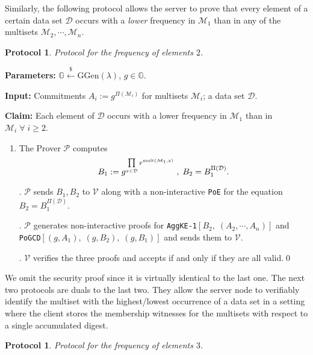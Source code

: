 \documentclass[11pt, lettersize, notitlepage, leqno, footskip=0.6cm]{article}
\newcommand{\pl}{\prod\limits}
\newcommand{\mc}{\mathcal}
\newcommand{\mb}{\mathbb}
\newcommand{\mr}{\mathrm}
\newcommand{\lamb}{\lambda}
\newcommand{\mP}{\mc{P}}
\newcommand{\V}{\mc{V}}
\newcommand{\vs}{\vspace{-0.15cm}}
\newcommand{\noin}{\noindent}
\newtheorem{Prot}[Thm]{Protocol}
\numberwithin{equation}{section}
\begin{document}
\vspace{0.2cm}

Similarly, the following protocol allows the server to prove that every element of a certain data set $\mc{D}$ occurs with a \textit{lower} frequency in $\mc{M}_1$ than in any of the multisets $\mc{M}_2,\cdots,\mc{M}_n$.

\begin{Prot} Protocol for the frequency of elements $2$.\end{Prot} \vspace{-0.3cm}

\noin \textbf{Parameters:} $\mb{G}\xleftarrow{\$} \mr{GGen}(\lamb)$,\; $g\in \mb{G}$.

\noin \textbf{Input:} Commitments $A_i := g^{\Pi(\mc{M}_i)}$ for multisets $\mc{M}_i$; a data set $\mc{D}$.

\noin \textbf{Claim:} Each element of $\mc{D}$ occurs with a lower frequency in $\mc{M}_1$ than in $\mc{M}_i\;\forall\;i\geq 2$. \vs

\begin{enumerate}[wide, labelwidth=!, labelindent=0pt] \vs \item The Prover $\mP$ computes \vs $$B_1:= g^{\pl_{x\in\mc{D}} x^{\mr{mult(\mc{M}_1, x)}}}\;,\; B_2 = B_1^{\Pi(\mc{D})}.\vs $$

\noin 2. $\mP$ sends $B_1, B_2$ to $\V$ along with a non-interactive \verb|PoE| for the equation $B_2= B_1^{\Pi(\mc{D})}$. 

\noin 3. $\mP$ generates non-interactive proofs for \verb|AggKE-1|$[B_2,\;(A_2,\cdots,A_n)]$ and\\ \verb|PoGCD|$[(g, A_1),\;(g, B_2),\;(g,B_1)]$ and sends them to $\V$. 

\noin 4. $\V$ verifies the three proofs and accepts if and only if they are all valid.\qed\end{enumerate}

We omit the security proof since it is virtually identical to the last one. The next two protocols are duals to the last two. They allow the server node to verifiably identify the multiset with the highest/lowest occurrence of a data set in a setting where the client stores the membership witnesses for the multisets with respect to a single accumulated digest.

\begin{Prot} Protocol for the frequency of elements $3$.\end{Prot} \vspace{-0.3cm}
\end{document}

